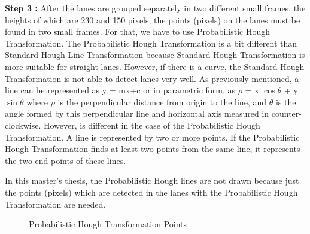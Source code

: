 \textbf{Step 3 : }After the lanes are grouped separately in two different small frames, the heights of which are 230 and 150 pixels, the points (pixels) on the lanes must be found in two small frames. For that, we have to use Probabilistic Hough Transformation. The Probabilistic Hough Transformation is a bit different than Standard Hough Line Transformation because Standard Hough Transformation is more suitable for straight lanes. However, if there is a curve, the Standard Hough Transformation is not able to detect lanes very well. As previously mentioned, a line can be represented as y = mx+c or in parametric form, as $\rho$ = x $\cos \theta$ + y$ \sin \theta$ where  $\rho$ is the perpendicular distance from origin to the line, and $\theta$ is the angle formed by this perpendicular line and horizontal axis measured in counter-clockwise. However, is different in the case of the Probabilistic Hough Transformation. A line is represented by two or more points. If the Probabilistic Hough Transformation finds at least two points from the same line, it represents the two end points of these lines.

In this master's thesis, the Probabilistic Hough lines are not drawn because just the points (pixels) which are detected in the lanes with the Probabilistic Hough Transformation are needed. 


\begin{figure}[H]
  \centering
  \hfill
  \caption{Probabilistic Hough Transformation Points}
\end{figure} 
 
